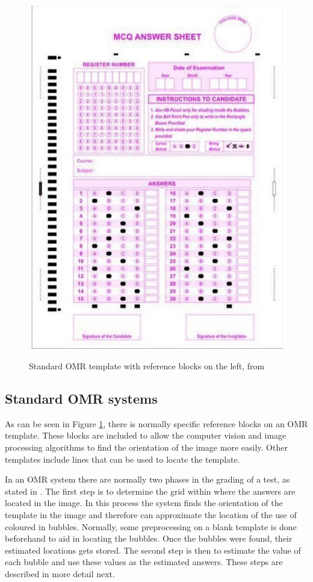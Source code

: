 \begin{figure}
  \centering
  \includegraphics[width=14cm]{omrTemplate}\\
  \caption{Standard OMR template with reference blocks on the left, from \citet{stdTemplate}}
  \label{fig:omrTemplate}
\end{figure}

\subsection{Standard OMR systems}
\label{sec:StandardTech}

As can be seen in Figure \ref{fig:omrTemplate}, there is normally specific reference blocks on an OMR template. These blocks are included to allow the computer vision and image processing algorithms to find the orientation of the image more easily. Other templates include lines that can be used to locate the template.

In an OMR system there are normally two phases in the grading of a test, as stated in \citet{DraganI2003}. The first step is to determine the grid within where the answers are located in the image. In this process the system finds the orientation of the template in the image and therefore can approximate the location of the use of coloured in bubbles. Normally, some preprocessing on a blank template is done beforehand to aid in locating the bubbles. Once the bubbles were found, their estimated locations gets stored. The second step is then to estimate the value of each bubble and use these values as the estimated answers. These steps are described in more detail next.

